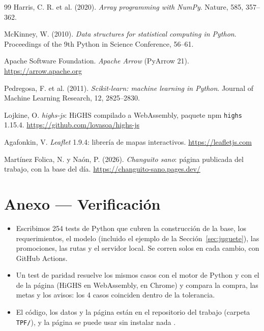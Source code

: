 \documentclass[10pt,a4paper]{article}
\begin{document}
\begin{thebibliography}{99}
 Harris, C. R. et al. (2020). \emph{Array programming with NumPy}.
  Nature, 585, 357--362.

 McKinney, W. (2010). \emph{Data structures for statistical computing
  in Python}. Proceedings of the 9th Python in Science Conference, 56--61.

 Apache Software Foundation. \emph{Apache Arrow} (PyArrow 21).
  \url{https://arrow.apache.org}

 Pedregosa, F. et al. (2011). \emph{Scikit-learn: machine learning
  in Python}. Journal of Machine Learning Research, 12, 2825--2830.

 Lojkine, O. \emph{highs-js}: HiGHS compilado a WebAssembly, paquete
  npm \texttt{highs} 1.15.4. \url{https://github.com/lovasoa/highs-js}

 Agafonkin, V. \emph{Leaflet} 1.9.4: librería de mapas interactivos.
  \url{https://leafletjs.com}

 Martínez Folica, N. y Naón, P. (2026). \emph{Changuito sano}:
  página publicada del trabajo, con la base del día.
  \url{https://changuito-sano.pages.dev/}

\end{thebibliography}

\section*{Anexo — Verificación}

\begin{itemize}
  \item Escribimos 254 tests de Python que cubren la construcción de la base, los
        requerimientos, el modelo (incluido el ejemplo de la
        Sección~\ref{sec:juguete}), las promociones, las rutas y el servidor local.
        Se corren solos en cada cambio, con GitHub Actions.
  \item Un test de paridad resuelve los mismos casos con el motor de Python y con el
        de la página (HiGHS en WebAssembly, en Chrome) y compara la compra, las metas
        y los avisos: los 4 casos coinciden dentro de la tolerancia.
  \item El código, los datos y la página están en el repositorio del trabajo
        (carpeta \texttt{TPF/}), y la página se puede usar sin instalar nada
        \cite{pagina}.
\end{itemize}
\end{document}
